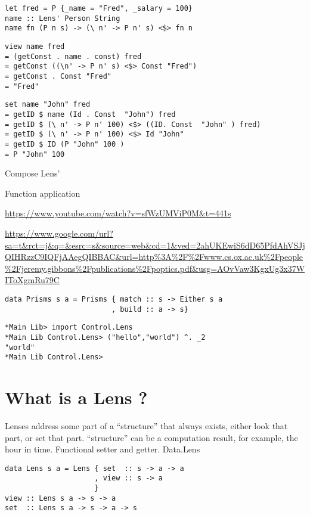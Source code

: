 \begin{verbatim}
let fred = P {_name = "Fred", _salary = 100}
name :: Lens' Person String
name fn (P n s) -> (\ n' -> P n' s) <$> fn n
\end{verbatim}

\begin{verbatim}
view name fred
= (getConst . name . const) fred
= getConst ((\n' -> P n' s) <$> Const "Fred")
= getConst . Const "Fred"
= "Fred"
\end{verbatim}

\begin{verbatim}
set name "John" fred
= getID $ name (Id . Const  "John") fred
= getID $ (\ n' -> P n' 100) <$> ((ID. Const  "John" ) fred)
= getID $ (\ n' -> P n' 100) <$> Id "John"
= getID $ ID (P "John" 100 )
= P "John" 100
\end{verbatim}


Compose Lens'

Function application

\url{https://www.youtube.com/watch?v=sfWzUMViP0M&t=441s}

\url{https://www.google.com/url?sa=t&rct=j&q=&esrc=s&source=web&cd=1&ved=2ahUKEwiS6dD65PfdAhVSJjQIHRzzC9IQFjAAegQIBBAC&url=http%3A%2F%2Fwww.cs.ox.ac.uk%2Fpeople%2Fjeremy.gibbons%2Fpublications%2Fpoptics.pdf&usg=AOvVaw3KgxUg3x37WIToXgmRu79C}




\begin{verbatim}
data Prisms s a = Prisms { match :: s -> Either s a
                         , build :: a -> s}
\end{verbatim}



\begin{verbatim}
*Main Lib> import Control.Lens
*Main Lib Control.Lens> ("hello","world") ^. _2
"world"
*Main Lib Control.Lens>
\end{verbatim}

\section{What is a Lens ?}
Lenses address some part of a “structure” that always exists, either look that part, or set that part.
“structure” can be a computation result, for example, the hour in time. Functional setter and getter.
  Data.Lens


\begin{verbatim}
data Lens s a = Lens { set  :: s -> a -> a
                     , view :: s -> a
                     }
view :: Lens s a -> s -> a
set  :: Lens s a -> s -> a -> s
\end{verbatim}

